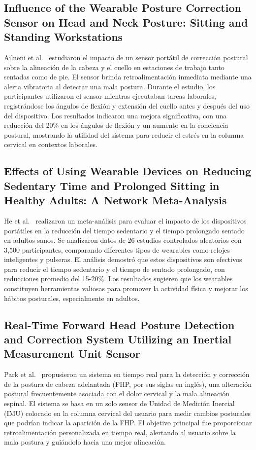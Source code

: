 \documentclass[manuscript,screen,review]{acmart}
\begin{document}
\subsection{Influence of the Wearable Posture Correction Sensor on Head and Neck Posture: Sitting and Standing Workstations}
Ailneni et al.\ \cite{ailneni2019influence} estudiaron el impacto de un sensor portátil de corrección postural sobre la alineación de la cabeza y el cuello en estaciones de trabajo tanto sentadas como de pie. El sensor brinda retroalimentación inmediata mediante una alerta vibratoria al detectar una mala postura. Durante el estudio, los participantes utilizaron el sensor mientras ejecutaban tareas laborales, registrándose los ángulos de flexión y extensión del cuello antes y después del uso del dispositivo. Los resultados indicaron una mejora significativa, con una reducción del 20\% en los ángulos de flexión y un aumento en la conciencia postural, mostrando la utilidad del sistema para reducir el estrés en la columna cervical en contextos laborales.

\subsection{Effects of Using Wearable Devices on Reducing Sedentary Time and Prolonged Sitting in Healthy Adults: A Network Meta-Analysis}
He et al.\ \cite{he2024effects} realizaron un meta-análisis para evaluar el impacto de los dispositivos portátiles en la reducción del tiempo sedentario y el tiempo prolongado sentado en adultos sanos. Se analizaron datos de 26 estudios controlados aleatorios con 3,500 participantes, comparando diferentes tipos de wearables como relojes inteligentes y pulseras. El análisis demostró que estos dispositivos son efectivos para reducir el tiempo sedentario y el tiempo de sentado prolongado, con reducciones promedio del 15-20\%. Los resultados sugieren que los wearables constituyen herramientas valiosas para promover la actividad física y mejorar los hábitos posturales, especialmente en adultos.


\subsection{Real-Time Forward Head Posture Detection and Correction System Utilizing an Inertial Measurement Unit Sensor}

Park et al.\ \cite{park2024real} propusieron un sistema en tiempo real para la detección y corrección de la postura de cabeza adelantada (FHP, por sus siglas en inglés), una alteración postural frecuentemente asociada con el dolor cervical y la mala alineación espinal. El sistema se basa en un solo sensor de Unidad de Medición Inercial (IMU) colocado en la columna cervical del usuario para medir cambios posturales que podrían indicar la aparición de la FHP. El objetivo principal fue proporcionar retroalimentación personalizada en tiempo real, alertando al usuario sobre la mala postura y guiándolo hacia una mejor alineación.
\end{document}
